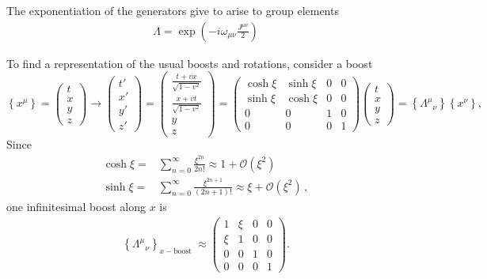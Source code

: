 The exponentiation of the generators give to arise to group elements
\begin{align}
  \Lambda=\exp\left(-i\omega_{\mu\nu}\frac{J^{\mu\nu}}{2}\right)
\end{align}


To find a representation of the usual boosts and rotations, 
consider a boost
\begin{equation}
  \left\{x^\mu\right\}=\begin{pmatrix}
    t\\
    x\\
    y\\
    z
  \end{pmatrix}\to
  \begin{pmatrix}
    t'\\
    x'\\
    y'\\
    z'
  \end{pmatrix}=
  \begin{pmatrix}
    \frac{t+vx}{\sqrt{1-v^2}}\\
    \frac{x+vt}{\sqrt{1-v^2}}\\
    y\\
    z
  \end{pmatrix}=
  \begin{pmatrix}
    \cosh\xi&\sinh\xi&0&0\\
    \sinh\xi&\cosh\xi&0&0\\
    0     &  0  &1&0\\
    0     &  0  &0&1
  \end{pmatrix}
  \begin{pmatrix}
    t\\
    x\\
    y\\
    z
  \end{pmatrix}=\left\{{\Lambda^\mu}_{\nu}\right\}\left\{x^\nu\right\},
\end{equation}
Since
\begin{align}
  \cosh\xi=&\sum_{n=0}^{\infty}\frac{\xi^{2n}}{2n!}\approx 1+\mathcal{O}(\xi^2)\nonumber\\
  \sinh\xi=&\sum_{n=0}^{\infty}\frac{\xi^{2n+1}}{(2n+1)!}\approx \xi+\mathcal{O}(\xi^2)\,,
\end{align}
one infinitesimal boost along $x$ is
\begin{align}
  \left\{{\Lambda^\mu}_{\nu}\right\}_{x-\text{boost }}\approx
  \begin{pmatrix}
    1&\xi&0&0\\
    \xi&1&0&0\\
    0&0&1&0\\
    0&0&0&1
  \end{pmatrix}.
\end{align}
